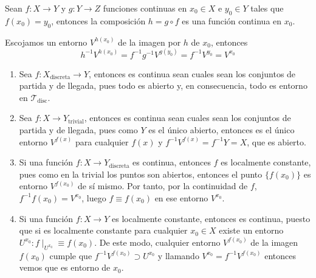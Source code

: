 \begin{prop}
Sean $f:X \rightarrow Y$ y $g: Y \rightarrow Z$ funciones continuas en $x_0\in X$ e $y_0\in Y$ tales que $f(x_0) = y_0$, entonces la composición $h = g \circ f$ es una función continua en $x_0$.
\end{prop}
\begin{demo}
Escojamos un entorno $V^{h\left( x_0 \right)}$ de la imagen por $h$ de $x_0$, entonces
\[
h^{-1} V^{h\left( x_0 \right)} = f^{-1}g^{-1}V^{g\left( y_0 \right)} = f^{-1} V^{y_0} = V^{x_0}
\]
\end{demo}

\begin{ej}
\begin{enumerate}
    \item Sea $f: X_{\text{discreta}} \rightarrow Y$, entonces es continua sean cuales sean los conjuntos de partida y de llegada, pues todo es abierto y, en consecuencia, todo es entorno en $\mathcal{T}_{\text{disc}}$.
    \item Sea $f: X \rightarrow Y_{\text{trivial}}$, entonces es continua sean cuales sean los conjuntos de partida y de llegada, pues como $Y$ es el único abierto, entonces es el único entorno $V^{f\left( x \right)}$ para cualquier $f(x)$ y $f^{-1}V^{f\left( x \right)} = f^{-1}Y = X$, que es abierto.
    \item Si una función $f: X \rightarrow Y_{\text{discreta}}$ es continua, entonces $f$ es localmente constante, pues como en la trivial los puntos son abiertos, entonces el punto $\{f\left( x_0 \right)\}$ es entorno $V^{f\left( x_0 \right)}$ de sí mismo. Por tanto, por la continuidad de $f$, $f^{-1}f\left( x_0 \right) = V^{x_0}$, luego $f \equiv f\left( x_0 \right)$ en ese entorno $V^{x_0}$.
    \item Si una función $f: X \rightarrow Y$ es localmente constante, entonces es continua, puesto que si es localmente constante para cualquier $x_0 \in X$ existe un entorno $U^{x_0} : f\mid_{U^{x_0}} \equiv f\left( x_0 \right)$. De este modo, cualquier entorno $V^{f\left( x_0 \right)}$ de la imagen $f(x_0)$ cumple que $f^{-1}V^{f\left( x_0 \right)} \supset U^{x_0}$ y llamando $V^{x_0} = f^{-1} V^{f\left( x_0 \right)}$ entonces vemos que es entorno de $x_0$.
\end{enumerate}
\end{ej}

